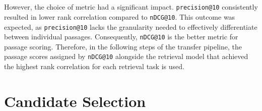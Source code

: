 \\\\
However, the choice of metric had a significant impact. \texttt{precision@10} consistently resulted in lower rank correlation compared to \texttt{nDCG@10}. This outcome was expected, as \texttt{precision@10} lacks the granularity needed to effectively differentiate between individual passages. Consequently, \texttt{nDCG@10} is the better metric for passage scoring. Therefore, in the following steps of the transfer pipeline, the passage scores assigned by \texttt{nDCG@10} alongside the retrieval model that achieved the highest rank correlation for each retrieval task is used.
\pagebreak


\section{Candidate Selection}\label{eval-candidate-selection}

